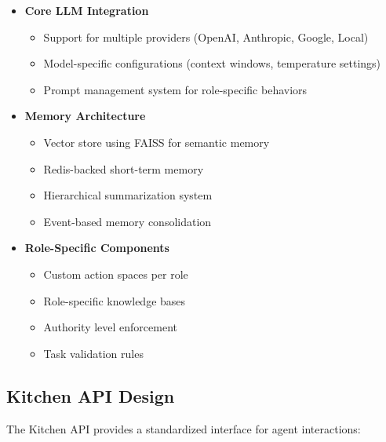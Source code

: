 \documentclass{article}
\begin{document}
\begin{itemize}
    \item \textbf{Core LLM Integration}
    \begin{itemize}
        \item Support for multiple providers (OpenAI, Anthropic, Google, Local)
        \item Model-specific configurations (context windows, temperature settings)
        \item Prompt management system for role-specific behaviors
    \end{itemize}
    
    \item \textbf{Memory Architecture}
    \begin{itemize}
        \item Vector store using FAISS for semantic memory
        \item Redis-backed short-term memory
        \item Hierarchical summarization system
        \item Event-based memory consolidation
    \end{itemize}
    
    \item \textbf{Role-Specific Components}
    \begin{itemize}
        \item Custom action spaces per role
        \item Role-specific knowledge bases
        \item Authority level enforcement
        \item Task validation rules
    \end{itemize}
\end{itemize}

\subsection{Kitchen API Design}
The Kitchen API provides a standardized interface for agent interactions:
\end{document}
